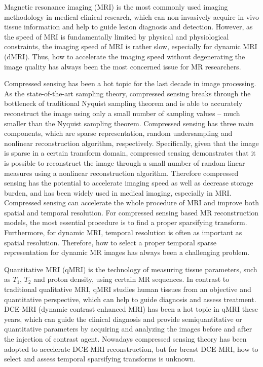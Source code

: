 \begin{englishabstract}
Magnetic resonance imaging (MRI) is the most commonly used imaging methodology in medical clinical research, which can non-invasively acquire in vivo tissue information and help to guide lesion diagnosis and detection. However, as the speed of MRI is fundamentally limited by physical and physiological constraints, the imaging speed of MRI is rather slow, especially for dynamic MRI (dMRI). Thus, how to accelerate the imaging speed without degenerating the image quality has always been the most concerned issue for MR researchers.

Compressed sensing has been a hot topic for the last decade in image processing. As the state-of-the-art sampling theory, compressed sensing breaks through the bottleneck of traditional Nyquist sampling theorem and is able to accurately reconstruct the image using only a small number of sampling values -- much smaller than the Nyquist sampling theorem. Compressed sensing has three main components, which are sparse representation, random undersampling and nonlinear reconstruction algorithm, respectively. Specifically, given that the image is sparse in a certain transform domain, compressed sensing demonstrates that it is possible to reconstruct the image through a small number of random linear measures using a nonlinear reconstruction algorithm. Therefore compressed sensing has the potential to accelerate imaging speed as well as decrease storage burden, and has been widely used in medical imaging, especially in MRI. Compressed sensing can accelerate the whole procedure of MRI and improve both spatial and temporal resolution. For compressed sensing based MR reconstruction models, the most essential procedure is to find a proper sparsifying transform. Furthermore, for dynamic MRI, temporal resolution is often as important as spatial resolution. Therefore, how to select a proper temporal sparse representation for dynamic MR images has always been a challenging problem.

Quantitative MRI (qMRI) is the technology of measuring tissue parameters, such as $T_1$, $T_2$ and proton density, using certain MR sequences. In contrast to traditional qualitative MRI, qMRI studies human tissues from an objective and quantitative perspective, which can help to guide diagnosis and assess treatment. DCE-MRI (dynamic contrast enhanced MRI) has been a hot topic in qMRI these years, which can guide the clinical diagnosis and provide semiquantitative or quantitative parameters by acquiring and analyzing the images before and after the injection of contrast agent. Nowadays compressed sensing theory has been adopted to accelerate DCE-MRI reconstruction, but for breast DCE-MRI, how to select and assess temporal sparsifying transforms is unknown.


\end{englishabstract}

